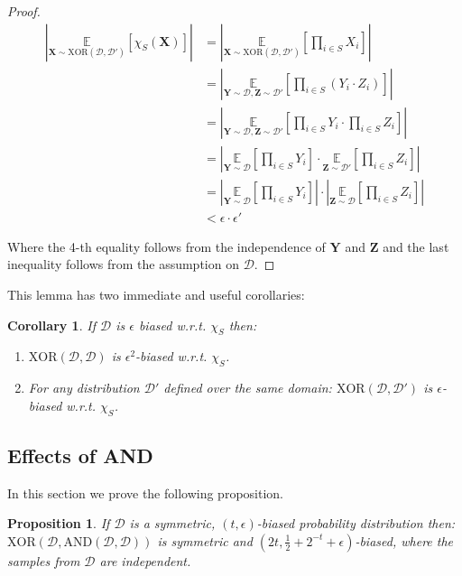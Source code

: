 \documentclass[12pt]{article}
\newtheorem{corollary}{Corollary}[theorem]
\newtheorem{proposition}[theorem]{Proposition}
\newcommand{\dist}{\mathcal{D}}
\newcommand{\AND}{\mathrm{AND} }
\newcommand{\XOR}{\mathrm{XOR} }
\newcommand{\E}{\mathbb{E}}
\newcommand{\abs}[1]{\left| #1 \right|}
\renewcommand{\vec}[1]{\bm{#1}}
\begin{document}
	\begin{proof}
		\begin{align*}
			\abs{\underset{\vec{X} \sim \XOR\left(\dist,\dist'\right)}{\E} \left[ \chi_S(\vec{X}) \right]}
			&= \abs{\underset{\vec{X} \sim \XOR\left(\dist,\dist'\right)}{\E} \left[ \prod_{i \in S} X_i \right]} \\
			&= \abs{\underset{\vec{Y} \sim \dist, \vec{Z} \sim \dist'}{\E} \left[ \prod_{i \in S} \left(Y_i \cdot Z_i \right) \right]} \\
			&= \abs{\underset{\vec{Y} \sim \dist, \vec{Z} \sim \dist'}{\E} \left[ \prod_{i \in S} Y_i \cdot \prod_{i \in S} Z_i  \right]} \\
			&= \abs{\underset{\vec{Y} \sim \dist}{\E} \left[ \prod_{i \in S} Y_i \right] \cdot \underset{\vec{Z} \sim \dist'}{\E} \left[ \prod_{i \in S} Z_i \right]} \\
			&= \abs{\underset{\vec{Y} \sim \dist}{\E} \left[ \prod_{i \in S} Y_i \right]} \cdot \abs{\underset{\vec{Z} \sim \dist}{\E} \left[ \prod_{i \in S} Z_i \right]} \\
			&< \epsilon \cdot \epsilon'
		\end{align*}
		
		Where the 4-th equality follows from the independence of $\vec{Y}$ and $\vec{Z}$ and the last inequality follows from the assumption on $\dist$.
		
	\end{proof}
	
	This lemma has two immediate and useful corollaries:
	
	\begin{corollary} \label{corollary: XOR bias}
		If $\dist$ is $\epsilon$ biased w.r.t. $\chi_S$ then:
		\begin{enumerate}
			\item $\XOR(\dist, \dist)$ is $\epsilon^2$-biased w.r.t. $\chi_S$.
			\item For any distribution $\dist'$ defined over the same domain: $\XOR(\dist, \dist')$ is $\epsilon$-biased w.r.t. $\chi_S$.
		\end{enumerate}
	\end{corollary}
	
	\subsection{Effects of AND}
	
	In this section we prove the following proposition.
	\begin{proposition} \label{proposition: simple ANDXOR bias}
		If $\dist$ is a symmetric, $(t, \epsilon)$-biased probability distribution then:
		$\XOR(\dist, \AND(\dist,\dist))$ is symmetric and $(2t, \frac{1}{2} + 2^{-t} + \epsilon)$-biased,
		where the samples from $\dist$ are independent.
	\end{proposition}
	
\end{document}
